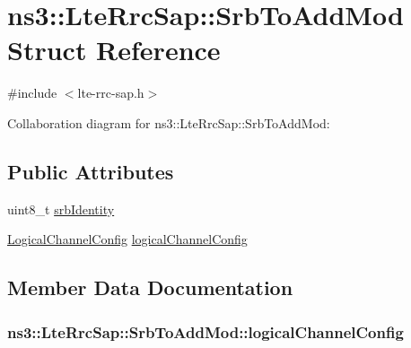 \hypertarget{structns3_1_1LteRrcSap_1_1SrbToAddMod}{}\section{ns3\+:\+:Lte\+Rrc\+Sap\+:\+:Srb\+To\+Add\+Mod Struct Reference}
\label{structns3_1_1LteRrcSap_1_1SrbToAddMod}


{\ttfamily \#include $<$lte-\/rrc-\/sap.\+h$>$}



Collaboration diagram for ns3\+:\+:Lte\+Rrc\+Sap\+:\+:Srb\+To\+Add\+Mod\+:
\subsection*{Public Attributes}
\begin{DoxyCompactItemize}
\item 
uint8\+\_\+t \hyperlink{structns3_1_1LteRrcSap_1_1SrbToAddMod_a57de3218fb9a1f32db153cd970f2fc37}{srb\+Identity}
\item 
\hyperlink{structns3_1_1LteRrcSap_1_1LogicalChannelConfig}{Logical\+Channel\+Config} \hyperlink{structns3_1_1LteRrcSap_1_1SrbToAddMod_a1a4c375faeb48039d63c5acaa35413cf}{logical\+Channel\+Config}
\end{DoxyCompactItemize}


\subsection{Member Data Documentation}
\subsubsection[{\texorpdfstring{logical\+Channel\+Config}{logicalChannelConfig}}]{ ns3\+::\+Lte\+Rrc\+Sap\+::\+Srb\+To\+Add\+Mod\+::logical\+Channel\+Config}\hypertarget{structns3_1_1LteRrcSap_1_1SrbToAddMod_a1a4c375faeb48039d63c5acaa35413cf}{}\label{structns3_1_1LteRrcSap_1_1SrbToAddMod_a1a4c375faeb48039d63c5acaa35413cf}
